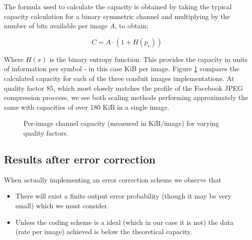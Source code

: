 The formula used to calculate the capacity is obtained by taking the typical capacity calculation for a binary symmetric channel and multiplying by the number of bits available per image $A$, to obtain:

\begin{equation}
    C = A \cdot (1 + H(p_e))
\end{equation}

Where $H(x)$ is the binary entropy function. This provides the capacity in units of information per symbol - in this case KiB per image. Figure \ref{graph:capacity} compares the calculated capacity for each of the three conduit images implementations. At quality factor 85, which most closely matches the profile of the Facebook JPEG compression proccess, we see both scaling methods performing approximately the same with capacities of over 180 KiB in a single image.

\begin{figure}[tbp]
  \begin{center}
    \caption{Per-image channel capacity (measured in KiB/image) for varying quality factors.}
    \label{graph:capacity}
  \end{center}
\end{figure}

\subsection{Results after error correction}

When actually implementing an error correction scheme we observe that
\begin{itemize}
    \item There will exist a finite output error probability (though it may be very small) which we must consider.
    \item Unless the coding scheme is a ideal (which in our case it is not) the data (rate per image) achieved is below the theoretical capacity.
\end{itemize}


